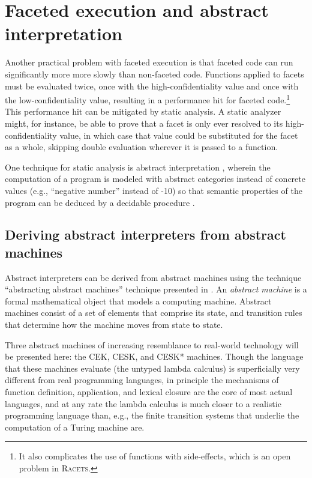 \documentclass{article}
\begin{document}
\section{Faceted execution and abstract interpretation\label{sec:ai}}
Another practical problem with faceted execution is that faceted code can run significantly more more slowly than non-faceted code. Functions applied to facets must be evaluated twice, once with the high-confidentiality value and once with the low-confidentiality value, resulting in a performance hit for faceted code.\footnote{It also complicates the use of functions with side-effects, which is an open problem in \textsc{Racets}.} This performance hit can be mitigated by static analysis. A static analyzer might, for instance, be able to prove that a facet is only ever resolved to its high-confidentiality value, in which case that value could be substituted for the facet as a whole, skipping double evaluation wherever it is passed to a function.

One technique for static analysis is abstract interpretation \cite{abstract-inter}, wherein the computation of a program is modeled with abstract categories instead of concrete values (e.g., ``negative number'' instead of -10) so that semantic properties of the program can be deduced by a decidable procedure \cite{ai-original}.


\subsection{Deriving abstract interpreters from abstract machines}
Abstract interpreters can be derived from abstract machines using the technique ``abstracting abstract machines'' technique presented in \cite{aam}. An \textit{abstract machine} is a formal mathematical object that models a computing machine. Abstract machines consist of a set of elements that comprise its state, and transition rules that determine how the machine moves from state to state.

Three abstract machines of increasing resemblance to real-world technology will be presented here: the CEK, CESK, and CESK* machines. Though the language that these machines evaluate (the untyped lambda calculus) is superficially very different from real programming languages, in principle the mechanisms of function definition, application, and lexical closure are the core of most actual languages, and at any rate the lambda calculus is much closer to a realistic programming language than, e.g., the finite transition systems that underlie the computation of a Turing machine are.
\end{document}
